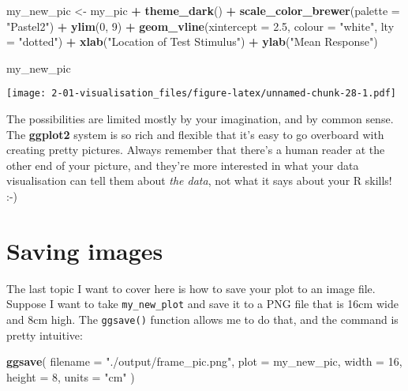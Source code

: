 \documentclass[]{book}
\newenvironment{Shaded}{\begin{snugshade}}{\end{snugshade}}
\newcommand{\DataTypeTok}[1]{\textcolor[rgb]{0.13,0.29,0.53}{#1}}
\newcommand{\DecValTok}[1]{\textcolor[rgb]{0.00,0.00,0.81}{#1}}
\newcommand{\FloatTok}[1]{\textcolor[rgb]{0.00,0.00,0.81}{#1}}
\newcommand{\KeywordTok}[1]{\textcolor[rgb]{0.13,0.29,0.53}{\textbf{#1}}}
\newcommand{\NormalTok}[1]{#1}
\newcommand{\OperatorTok}[1]{\textcolor[rgb]{0.81,0.36,0.00}{\textbf{#1}}}
\newcommand{\StringTok}[1]{\textcolor[rgb]{0.31,0.60,0.02}{#1}}
\begin{document}
\begin{Shaded}
\begin{Highlighting}[]
\NormalTok{my_new_pic <-}\StringTok{ }\NormalTok{my_pic }\OperatorTok{+}\StringTok{ }
\StringTok{  }\KeywordTok{theme_dark}\NormalTok{() }\OperatorTok{+}
\StringTok{  }\KeywordTok{scale_color_brewer}\NormalTok{(}\DataTypeTok{palette =} \StringTok{"Pastel2"}\NormalTok{) }\OperatorTok{+}
\StringTok{  }\KeywordTok{ylim}\NormalTok{(}\DecValTok{0}\NormalTok{, }\DecValTok{9}\NormalTok{) }\OperatorTok{+}\StringTok{ }
\StringTok{  }\KeywordTok{geom_vline}\NormalTok{(}\DataTypeTok{xintercept =} \FloatTok{2.5}\NormalTok{, }\DataTypeTok{colour =} \StringTok{"white"}\NormalTok{, }\DataTypeTok{lty =} \StringTok{"dotted"}\NormalTok{) }\OperatorTok{+}
\StringTok{  }\KeywordTok{xlab}\NormalTok{(}\StringTok{"Location of Test Stimulus"}\NormalTok{) }\OperatorTok{+}
\StringTok{  }\KeywordTok{ylab}\NormalTok{(}\StringTok{"Mean Response"}\NormalTok{)}

\NormalTok{my_new_pic}
\end{Highlighting}
\end{Shaded}

\texttt{[image: 2-01-visualisation\_files/figure-latex/unnamed-chunk-28-1.pdf]}

The possibilities are limited mostly by your imagination, and by common sense. The \textbf{ggplot2} system is so rich and flexible that it's easy to go overboard with creating pretty pictures. Always remember that there's a human reader at the other end of your picture, and they're more interested in what your data visualisation can tell them about \emph{the data}, not what it says about your R skills! :-)

\hypertarget{saving-images}{%
\section{Saving images}\label{saving-images}}

The last topic I want to cover here is how to save your plot to an image file. Suppose I want to take \texttt{my\_new\_plot} and save it to a PNG file that is 16cm wide and 8cm high. The \texttt{ggsave()} function allows me to do that, and the command is pretty intuitive:

\begin{Shaded}
\begin{Highlighting}[]
\KeywordTok{ggsave}\NormalTok{(}
  \DataTypeTok{filename =} \StringTok{"./output/frame_pic.png"}\NormalTok{,}
  \DataTypeTok{plot =}\NormalTok{ my_new_pic,}
  \DataTypeTok{width =} \DecValTok{16}\NormalTok{,}
  \DataTypeTok{height =} \DecValTok{8}\NormalTok{,}
  \DataTypeTok{units =} \StringTok{"cm"}
\NormalTok{)}
\end{Highlighting}
\end{Shaded}
\end{document}
